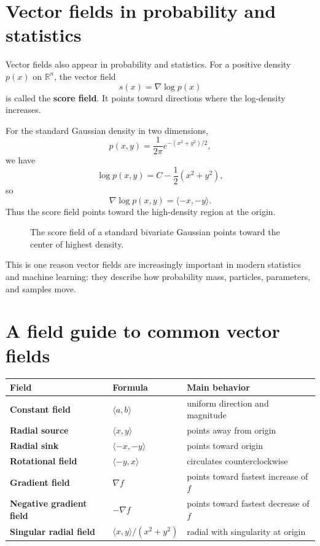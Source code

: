 \documentclass[11pt]{article}
\newcommand{\R}{\mathbb R}
\newcommand{\grad}{\nabla}
\begin{document}
\section{Vector fields in probability and statistics}

Vector fields also appear in probability and statistics. For a positive density $p(x)$ on $\R^n$, the vector field
\[
s(x)=\grad \log p(x)
\]
is called the \textbf{score field}. It points toward directions where the log-density increases.

For the standard Gaussian density in two dimensions,
\[
p(x,y)=\frac{1}{2\pi}e^{-(x^2+y^2)/2},
\]
we have
\[
\log p(x,y)=C-\frac12(x^2+y^2),
\]
so
\[
\grad\log p(x,y)=\langle -x,-y\rangle.
\]
Thus the score field points toward the high-density region at the origin.

\begin{figure}[H]
\centering
{}
\caption{The score field of a standard bivariate Gaussian points toward the center of highest density.}
\end{figure}

This is one reason vector fields are increasingly important in modern statistics and machine learning: they describe how probability mass, particles, parameters, and samples move.

\section{A field guide to common vector fields}

\begin{center}
\begin{tabularx}{\textwidth}{@{}>{\bfseries}l>{\centering\arraybackslash}X X@{}}
\toprule
Field & Formula & Main behavior \\
\midrule
Constant field & $\langle a,b\rangle$ & uniform direction and magnitude \\
Radial source & $\langle x,y\rangle$ & points away from origin \\
Radial sink & $\langle -x,-y\rangle$ & points toward origin \\
Rotational field & $\langle -y,x\rangle$ & circulates counterclockwise \\
Gradient field & $\grad f$ & points toward fastest increase of $f$ \\
Negative gradient field & $-\grad f$ & points toward fastest decrease of $f$ \\
Singular radial field & $\langle x,y\rangle/(x^2+y^2)$ & radial with singularity at origin \\
\bottomrule
\end{tabularx}
\end{center}
\end{document}
